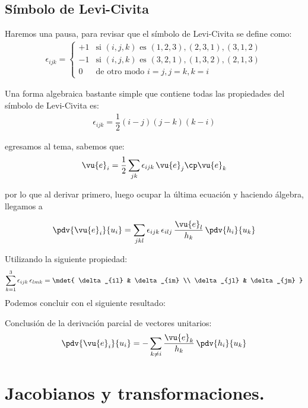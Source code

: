 \subsection*{Símbolo de Levi-Civita}

Haremos una pausa, para revisar que el símbolo de Levi-Civita se define como:
\begin{align*}
\epsilon_{ijk} = \begin{cases}
+1 & \mbox{si } (i, j, k) \mbox{ es } (1, 2, 3), (2, 3, 1), (3, 1, 2) \\[0.5em]
-1 & \mbox{si } (i, j, k) \mbox{ es } (3, 2, 1), (1, 3, 2), (2, 1, 3) \\[0.5em]
0 & \mbox{de otro modo } i = j, j = k, k = i 
\end{cases}
\end{align*}

Una forma algebraica bastante simple que contiene todas las propiedades del símbolo de Levi-Civita es:
\begin{align*}
\epsilon_{ijk} = \dfrac{1}{2} (i - j) (j - k) (k - i)
\end{align*}

egresamos al tema, sabemos que:
\begin{align*}
\vu{e}_{i} = \dfrac{1}{2} \sum_{jk} \epsilon_{ijk} \, \vu{e}_{j} \cp \vu{e}_{k}
\end{align*}

por lo que al derivar primero, luego ocupar la última ecuación y haciendo álgebra, llegamos a

\begin{align*}
\pdv{\vu{e}_{i}}{u_{i}} = \sum_{jkl} \epsilon_{ijk} \, \epsilon_{ilj} \, \dfrac{\vu{e}_{l}}{h_{k}} \, \pdv{h_{i}}{u_{k}}
\end{align*}

Utilizando la siguiente propiedad:
\begin{align*}
\sum_{k=1}^{3} \epsilon_{ijk} \, \epsilon_{lmk} = \mdet{
\delta_{il} & \delta_{im} \\
\delta_{jl} & \delta_{jm} }
\end{align*}
Podemos concluir con el siguiente resultado:

Conclusión de la derivación parcial de vectores unitarios:
\begin{align*}
\pdv{\vu{e}_{i}}{u_{i}} = - \sum_{k \neq i} \dfrac{\vu{e}_{k}}{h_{k}} \, \pdv{h_{i}}{u_k}
\end{align*}

\section{Jacobianos y transformaciones.}

